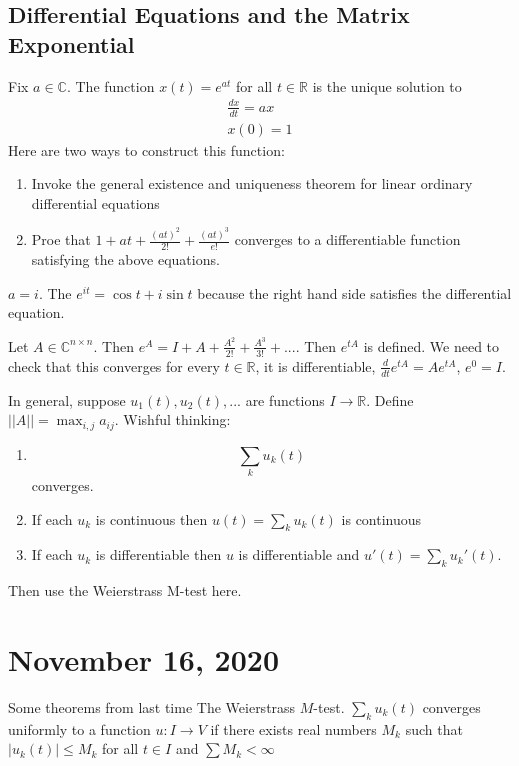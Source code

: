 \documentclass{article}
\newcommand{\C}{\mathbb{C}}
\newcommand{\R}{\mathbb{R}}
\newcommand{\ra}[1][]{\xrightarrow{#1}}
\begin{document}
\subsection{Differential Equations and the Matrix Exponential}
Fix $a\in\C$. The function $x(t)=e^{at}$ for all $t\in\R$ is the unique solution to
\begin{equation*}
    \begin{split}
        \frac{dx}{dt}=ax\\
        x(0)=1
    \end{split}
\end{equation*}
Here are two ways to construct this function:
\begin{enumerate}
    \item Invoke the general existence and uniqueness theorem for linear ordinary differential equations
    \item Proe that $1+at+\frac{(at)^2}{2!}+\frac{(at)^3}{e!}$ converges to a differentiable function satisfying the above equations.
\end{enumerate}
\begin{example}
$a=i$. The $e^{it}=\cos t+i\sin t$ because the right hand side satisfies the differential equation.
\end{example}
\begin{definition}
Let $A\in\C^{n\times n}$. Then $e^A=I+A+\frac{A^2}{2!}+\frac{A^3}{3!}+...$. Then $e^{tA}$ is defined. We need to check that this converges for every $t\in\R$, it is differentiable, $\frac{d}{dt}e^{tA}=Ae^{tA}$, $e^0=I$.
\end{definition}
In general, suppose $u_1(t),u_2(t),...$ are functions $I\ra \R$. Define $||A||=\max_{i,j} a_{ij}$.
Wishful thinking:
\begin{enumerate}
    \item $$\sum_k u_k(t)$$ converges.
    \item If each $u_k$ is continuous then $u(t)=\sum_k u_k(t)$ is continuous
    \item If each $u_k$ is differentiable then $u$ is differentiable and $u'(t)=\sum_k u_k'(t)$.
\end{enumerate}
Then use the Weierstrass M-test here.
\section{November 16, 2020}
Some theorems from last time
The Weierstrass $M$-test. $\sum_k u_k(t)$ converges uniformly to a function $u:I\ra V$ if there exists real numbers $M_k$ such that $|u_k(t)|\leq M_k$ for all $t\in I$ and $\sum M_k<\infty$
\end{document}
